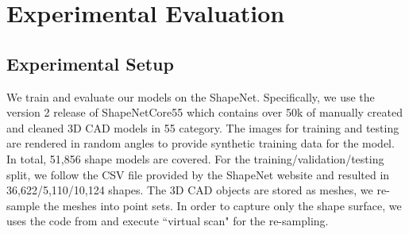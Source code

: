 \section{Experimental Evaluation}
\subsection{Experimental Setup}
We train and evaluate our models on the ShapeNet\citep{shapenetdata}. Specifically, we use the version 2 release of ShapeNetCore55 which contains over 50k of
manually created and cleaned 3D CAD models in 55 category.
The images for training
and testing are rendered in random angles to provide synthetic training data for the model. In total,
51,856 shape models are covered. For the training/validation/testing split, we follow the CSV file provided by the ShapeNet website and resulted in 36,622/5,110/10,124 shapes. The 3D CAD objects are
stored as meshes, we re-sample the meshes into point sets. In order to capture only the shape surface, we uses the code from \citep{Wang-2017-OCNN} and execute ``virtual scan" for the re-sampling.
